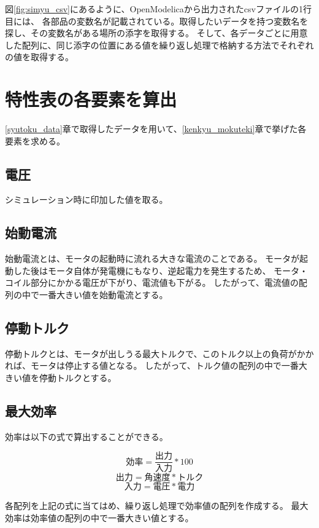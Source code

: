 図\ref{fig:simyu_csv}にあるように、OpenModelicaから出力されたcsvファイルの1行目には、
各部品の変数名が記載されている。取得したいデータを持つ変数名を探し、その変数名がある場所の添字を取得する。
そして、各データごとに用意した配列に、同じ添字の位置にある値を繰り返し処理で格納する方法でそれぞれの値を取得する。

\section{特性表の各要素を算出}\label{keisan}
\ref{syutoku_data}章で取得したデータを用いて、\ref{kenkyu_mokuteki}章で挙げた各要素を求める。

\subsection{電圧}\label{sub:dennatu}
シミュレーション時に印加した値を取る。

\subsection{始動電流}\label{sub:sidouden}
始動電流とは、モータの起動時に流れる大きな電流のことである。
モータが起動した後はモータ自体が発電機にもなり、逆起電力を発生するため、
モータ・コイル部分にかかる電圧が下がり、電流値も下がる。
したがって、電流値の配列の中で一番大きい値を始動電流とする。

\subsection{停動トルク}\label{sub:teidoutoruku}
停動トルクとは、モータが出しうる最大トルクで、このトルク以上の負荷がかかれば、モータは停止する値となる。
したがって、トルク値の配列の中で一番大きい値を停動トルクとする。

\subsection{最大効率}\label{sub:saidaikouritu}
効率は以下の式で算出することができる。

\[
    \mbox{効率} = \frac{\mbox{出力}}{\mbox{入力}}  * 100 
\]
\[
    \mbox{出力} = \mbox{角速度} * \mbox{トルク} 
\]
\[  
    \mbox{入力} = \mbox{電圧} * \mbox{電力} 
\]

各配列を上記の式に当てはめ、繰り返し処理で効率値の配列を作成する。
最大効率は効率値の配列の中で一番大きい値とする。


